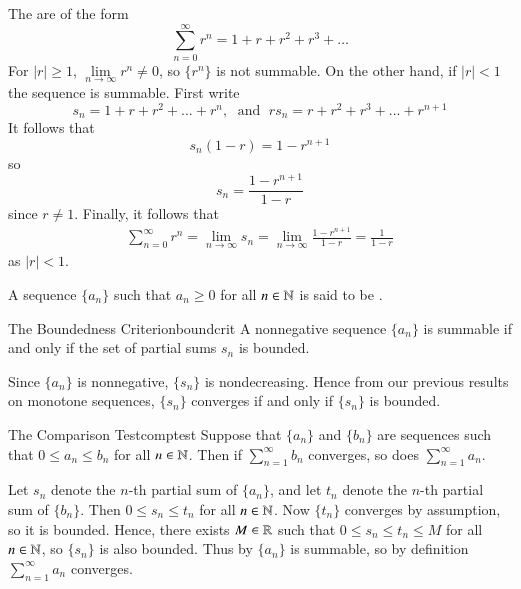 \documentclass[12pt]{report}
\begin{document}
\begin{eg*}{}{}
    The  are of the form \begin{equation*}
        \sum\limits_{n=0}^{\infty}r^n = 1+r+r^2+r^3+\hdots
    \end{equation*}
    For $|r| \geq 1$, $\lim\limits_{n\rightarrow \infty}r^n \neq 0$, so $\{r^n\}$ is not summable. On the other hand, if $|r| < 1$ the sequence is summable. First write $$s_n = 1+r+r^2+...+r^n,\;\text{ and }\;rs_n = r+r^2+r^3+...+r^{n+1}$$
    It follows that $$s_n(1-r) = 1 - r^{n+1}$$ so $$s_n = \frac{1-r^{n+1}}{1-r}$$ since $r \neq 1$. Finally, it follows that \begin{align*}
        \sum\limits_{n=0}^{\infty}r^n = \lim\limits_{n\rightarrow \infty}s_n = \lim\limits_{n\rightarrow \infty}\frac{1-r^{n+1}}{1-r} = \frac{1}{1-r}
    \end{align*}
    as $|r| < 1$.
\end{eg*}

\begin{defn}{}{}
    A sequence $\{a_n\}$ such that $a_n\geq 0$ for all $n \in \mathbb N$ is said to be .
\end{defn}

\begin{namthm}{The Boundedness Criterion}{boundcrit}
    A nonnegative sequence $\{a_n\}$ is summable if and only if the set of partial sums $s_n$ is bounded.
\end{namthm}
\begin{proof*}{}{}
    Since $\{a_n\}$ is nonnegative, $\{s_n\}$ is nondecreasing. Hence from our previous results on monotone sequences, $\{s_n\}$ converges if and only if $\{s_n\}$ is bounded.
\end{proof*}


\begin{namthm}{The Comparison Test}{comptest}
    Suppose that $\{a_n\}$ and $\{b_n\}$ are sequences such that $0 \leq a_n \leq b_n$ for all $n \in \mathbb N$. Then if $\sum\limits_{n=1}^{\infty}b_n$ converges, so does $\sum\limits_{n=1}^{\infty}a_n$.
\end{namthm}
\begin{proof*}{}{}
    Let $s_n$ denote the $n$-th partial sum of $\{a_n\}$, and let $t_n$ denote the $n$-th partial sum of $\{b_n\}$. Then $0 \leq s_n \leq t_n$ for all $n \in \mathbb N$. Now $\{t_n\}$ converges by assumption, so it is bounded. Hence, there exists $M \in \mathbb R$ such that $0 \leq s_n \leq t_n \leq M$ for all $n\in \mathbb N$, so $\{s_n\}$ is also bounded. Thus by  $\{a_n\}$ is summable, so by definition $\sum\limits_{n=1}^{\infty}a_n$ converges.
\end{proof*}
\end{document}
